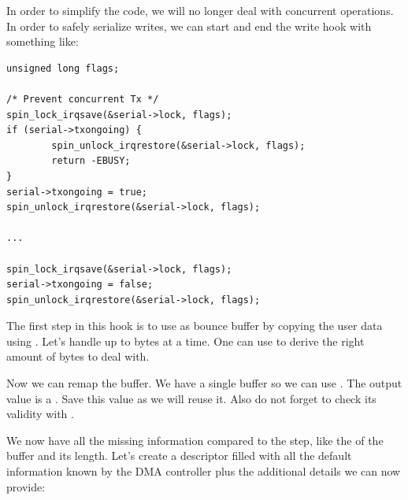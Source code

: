 In order to simplify the code, we will no longer deal with concurrent
operations. In order to safely serialize writes, we can start and end the write
hook with something like:

\begin{verbatim}
unsigned long flags;

/* Prevent concurrent Tx */
spin_lock_irqsave(&serial->lock, flags);
if (serial->txongoing) {
        spin_unlock_irqrestore(&serial->lock, flags);
        return -EBUSY;
}
serial->txongoing = true;
spin_unlock_irqrestore(&serial->lock, flags);

...

spin_lock_irqsave(&serial->lock, flags);
serial->txongoing = false;
spin_unlock_irqrestore(&serial->lock, flags);
\end{verbatim}

The first step in this  hook is to use  as
bounce buffer by copying the user data using . Let's
handle up to  bytes at a time. One can use 
to derive the right amount of bytes to deal with.

\if{}\else{}\fi

Now we can remap the buffer. We have a single buffer so we can use
. The output value is a . Save this
value as we will reuse it. Also do not forget to check its validity with
.

We now have all the missing information compared to the 
step, like the  of the buffer and its length. Let's create a
descriptor filled with all the default information known by the DMA controller
plus the additional details we can now provide:

